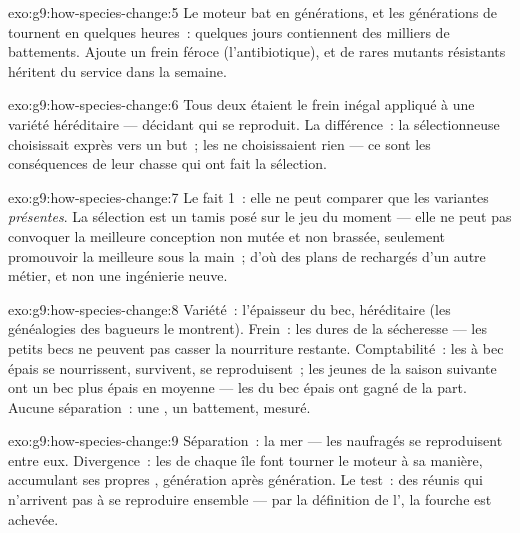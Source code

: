 \begin{solution}{exo:g9:how-species-change:5}
Le moteur bat en générations, et les générations de 
tournent en quelques heures~: quelques jours contiennent des
milliers de battements. Ajoute un frein féroce
(l'antibiotique), et de rares mutants résistants héritent du
service dans la semaine.
\end{solution}

\begin{solution}{exo:g9:how-species-change:6}
Tous deux étaient le frein inégal appliqué à une variété
héréditaire --- décidant qui se reproduit. La différence~:
la sélectionneuse choisissait exprès vers un but~; les
 ne choisissaient rien --- ce sont les conséquences
de leur chasse qui ont fait la sélection.
\end{solution}

\begin{solution}{exo:g9:how-species-change:7}
Le fait 1~: elle ne peut comparer que les variantes
\emph{présentes}. La sélection est un tamis posé sur le jeu
du moment --- elle ne peut pas convoquer la meilleure
conception non mutée et non brassée, seulement promouvoir la
meilleure sous la main~; d'où des plans de  rechargés
d'un autre métier, et non une ingénierie neuve.
\end{solution}

\begin{solution}{exo:g9:how-species-change:8}
Variété~: l'épaisseur du bec, héréditaire (les généalogies
des bagueurs le montrent). Frein~: les  dures de la
sécheresse --- les petits becs ne peuvent pas casser la
nourriture restante. Comptabilité~: les  à bec épais
se nourrissent, survivent, se reproduisent~; les jeunes de
la saison suivante ont un bec plus épais en moyenne --- les
 du bec épais ont gagné de la part. Aucune
séparation~: une , un battement, mesuré.
\end{solution}

\begin{solution}{exo:g9:how-species-change:9}
Séparation~: la mer --- les naufragés se reproduisent entre
eux. Divergence~: les  de chaque île font tourner
le moteur à sa manière, accumulant ses propres ,
génération après génération. Le test~: des  réunis
qui n'arrivent pas à se reproduire ensemble --- par la
définition de l', la fourche est achevée.
\end{solution}

